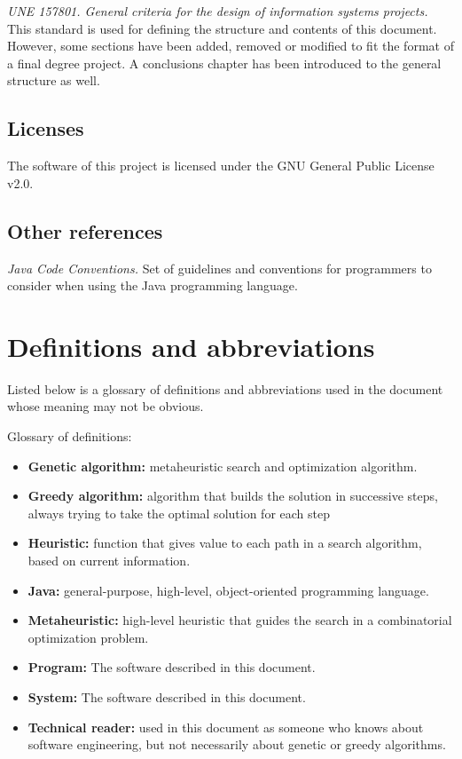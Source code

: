 \textit{UNE 157801. General criteria for the design of information systems projects.} This standard is used for defining the structure and contents of this document. However, some sections have been added, removed or modified to fit the format of a final degree project. A conclusions chapter has been introduced to the general structure as well.

\subsection{Licenses}

The software of this project is licensed under the GNU General Public License v2.0.

\subsection{Other references}

\textit{Java Code Conventions.} Set of guidelines and conventions for programmers to consider when using the Java programming language.

\section{Definitions and abbreviations}

Listed below is a glossary of definitions and abbreviations used in the document whose meaning may not be obvious.

Glossary of definitions:

\begin{itemize}
    \item \textbf{Genetic algorithm:} metaheuristic search and optimization algorithm. 
    \item \textbf{Greedy algorithm:} algorithm that builds the solution in successive steps, always trying to take the optimal solution for each step
    \item \textbf{Heuristic:} function that gives value to each path in a search algorithm, based on current information.
    \item \textbf{Java:} general-purpose, high-level, object-oriented programming language.
    \item \textbf{Metaheuristic:} high-level heuristic that guides the search in a combinatorial optimization problem.
    \item \textbf{Program:} The software described in this document.
    \item \textbf{System:} The software described in this document.
    \item \textbf{Technical reader:} used in this document as someone who knows about software engineering, but not necessarily about genetic or greedy algorithms.
\end{itemize}

